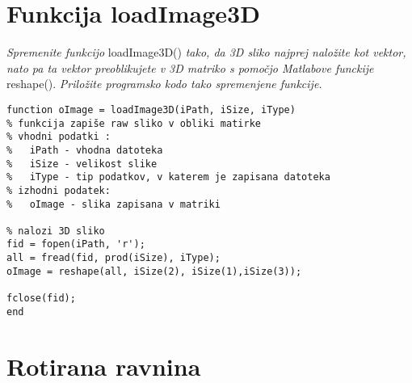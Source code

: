 \documentclass[12pt,a4paper]{article}
\begin{document}
\section{Funkcija loadImage3D}
\textit{Spremenite funkcijo} {\ttfamily loadImage3D()} \textit{tako, da 3D sliko najprej naložite kot vektor, nato pa
ta vektor preoblikujete v 3D matriko s pomočjo Matlabove  funckije }{\ttfamily reshape()}.\textit{ Priložite
programsko kodo tako spremenjene funkcije.}
\begin{verbatim}
function oImage = loadImage3D(iPath, iSize, iType)
% funkcija zapiše raw sliko v obliki matirke
% vhodni podatki :
%   iPath - vhodna datoteka
%   iSize - velikost slike
%   iType - tip podatkov, v katerem je zapisana datoteka
% izhodni podatek:
%   oImage - slika zapisana v matriki 

% nalozi 3D sliko
fid = fopen(iPath, 'r');
all = fread(fid, prod(iSize), iType);
oImage = reshape(all, iSize(2), iSize(1),iSize(3));

fclose(fid);
end  

\end{verbatim}
\section{Rotirana ravnina}
\end{document}
